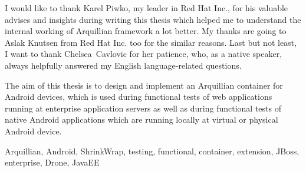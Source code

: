 \documentclass[12pt,final,oneside]{fithesis}
\begin{document}
\newcommand{\bb}[1]{\textbf{#1}}
\newcommand{\code}[1]{\emph{#1}}
\newcommand{\n}{\lstinline|\n|}


\lstset{language=Awk}
\lstset{frame=single}
\lstset{framesep=10pt}
\lstset{upquote=true}
\lstset{basicstyle=\ttfamily}


\FrontMatter
\ThesisTitlePage

\begin{ThesisDeclaration}
\DeclarationText
\AdvisorName
\end{ThesisDeclaration}

\begin{ThesisThanks}
I would like to thank Karel Piwko, my leader in Red Hat Inc., for his valuable advises and insights during writing this thesis which helped me to understand the internal working of Arquillian framework a lot better. My thanks are going to Aslak Knutsen from Red Hat Inc. too for the similar reasons. Last but not least, I want to thank Chelsea~Cavlovic for her patience, who, as a native speaker, always helpfully answered my English language-related questions.
 
\end{ThesisThanks}

\begin{ThesisAbstract}
The aim of this thesis is to design and implement an Arquillian container for Android devices, which is used during functional tests of web applications running at enterprise application servers as well as during functional tests of native Android applications which are running locally at virtual or physical Android device.
\end{ThesisAbstract}

\begin{ThesisKeyWords}
Arquillian, Android, ShrinkWrap, testing, functional, container, extension, JBoss, enterprise, Drone, JavaEE
\end{ThesisKeyWords}


\clearpage
\thispagestyle{plain}
\par{}
\end{document}
